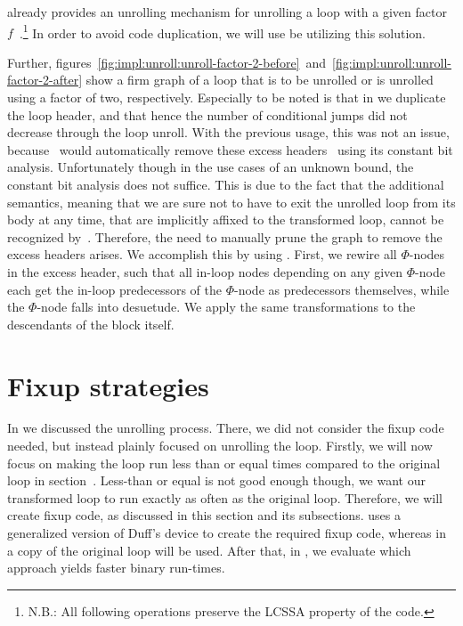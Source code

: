 \libFIRM{} already provides an unrolling mechanism for unrolling a loop with a given factor $f$~\cite{aebi18bachelorarbeit}.\footnote{N.B.: All following operations preserve the LCSSA property of the code.}
In order to avoid code duplication, we will use be utilizing this solution.

Further, figures~\ref{fig:impl:unroll:unroll-factor-2-before}~and~\ref{fig:impl:unroll:unroll-factor-2-after} show a firm graph of a loop that is to be unrolled or is unrolled using a factor of two, respectively.
Especially to be noted is that in  we duplicate the loop header, and that hence the number of conditional jumps did not decrease through the loop unroll.
With the previous usage, this was not an issue, because~\libFIRM{} would automatically remove these excess headers~\cite{aebi18bachelorarbeit} using its constant bit analysis.
Unfortunately though in the use cases of an unknown bound, the constant bit analysis does not suffice.
This is due to the fact that the additional semantics, meaning that we are sure not to have to exit the unrolled loop from its body at any time, that are implicitly affixed to the transformed loop, cannot be recognized by~\libFIRM.
Therefore, the need to manually prune the graph to remove the excess headers arises.
We accomplish this by using .
First, we rewire all $\Phi$-nodes in the excess header, such that all in-loop nodes depending on any given $\Phi$-node each get the in-loop predecessors of the $\Phi$-node as predecessors themselves, while the $\Phi$-node falls into desuetude.
We apply the same transformations to the descendants of the block itself.







\newpage

\section{Fixup strategies}\label{sec:impl:fixup}

In  we discussed the unrolling process.
There, we did not consider the fixup code needed, but instead plainly focused on unrolling the loop.
Firstly, we will now focus on making the loop run less than or equal times compared to the original loop in section~.
Less-than or equal is not good enough though, we want our transformed loop to run exactly as often as the original loop.
Therefore, we will create fixup code, as discussed in this section and its subsections.
 uses a generalized version of Duff's device to create the required fixup code, whereas in  a copy of the original loop will be used.
After that, in , we evaluate which approach yields faster binary run-times.


